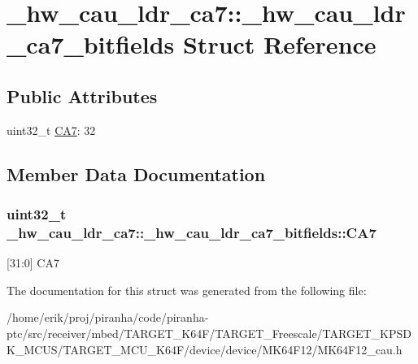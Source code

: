 \hypertarget{struct__hw__cau__ldr__ca7_1_1__hw__cau__ldr__ca7__bitfields}{}\section{\+\_\+hw\+\_\+cau\+\_\+ldr\+\_\+ca7\+:\+:\+\_\+hw\+\_\+cau\+\_\+ldr\+\_\+ca7\+\_\+bitfields Struct Reference}
\label{struct__hw__cau__ldr__ca7_1_1__hw__cau__ldr__ca7__bitfields}
\subsection*{Public Attributes}
\begin{DoxyCompactItemize}
\item 
uint32\+\_\+t \hyperlink{struct__hw__cau__ldr__ca7_1_1__hw__cau__ldr__ca7__bitfields_a50575a0528941f1cb3ac2eade0c95a3d}{C\+A7}\+: 32
\end{DoxyCompactItemize}


\subsection{Member Data Documentation}
\subsubsection[{\texorpdfstring{C\+A7}{CA7}}]{\setlength{\rightskip}{0pt plus 5cm}uint32\+\_\+t \+\_\+hw\+\_\+cau\+\_\+ldr\+\_\+ca7\+::\+\_\+hw\+\_\+cau\+\_\+ldr\+\_\+ca7\+\_\+bitfields\+::\+C\+A7}\hypertarget{struct__hw__cau__ldr__ca7_1_1__hw__cau__ldr__ca7__bitfields_a50575a0528941f1cb3ac2eade0c95a3d}{}\label{struct__hw__cau__ldr__ca7_1_1__hw__cau__ldr__ca7__bitfields_a50575a0528941f1cb3ac2eade0c95a3d}
\mbox{[}31\+:0\mbox{]} C\+A7 

The documentation for this struct was generated from the following file\+:\begin{DoxyCompactItemize}
\item 
/home/erik/proj/piranha/code/piranha-\/ptc/src/receiver/mbed/\+T\+A\+R\+G\+E\+T\+\_\+\+K64\+F/\+T\+A\+R\+G\+E\+T\+\_\+\+Freescale/\+T\+A\+R\+G\+E\+T\+\_\+\+K\+P\+S\+D\+K\+\_\+\+M\+C\+U\+S/\+T\+A\+R\+G\+E\+T\+\_\+\+M\+C\+U\+\_\+\+K64\+F/device/device/\+M\+K64\+F12/M\+K64\+F12\+\_\+cau.\+h\end{DoxyCompactItemize}
